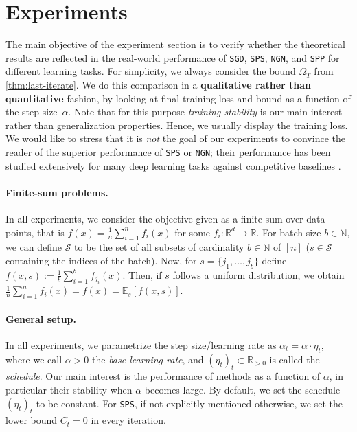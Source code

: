 \documentclass{article}
\newcommand{\R}{\mathbb{R}}
\newcommand{\N}{\mathbb{N}}
\newcommand{\E}{\mathbb{E}}
\newcommand{\SGD}{{\texttt{SGD}}}
\newcommand{\SPP}{{\texttt{SPP}}}
\newcommand{\SPS}{{\texttt{SPS}}}
\newcommand{\NGN}{{\texttt{NGN}}}
\theoremstyle{plain}
\theoremstyle{definition}
\theoremstyle{remark}
\begin{document}
\section{Experiments}\label{sec:experiments}
%
The main objective of the experiment section is to verify whether the theoretical results are reflected in the real-world performance of \SGD{}, \SPS{}, \NGN{}, and \SPP{} for different learning tasks. For simplicity, we always consider the bound $\Omega_T$ from  \cref{thm:last-iterate}. We do this comparison in a \textbf{qualitative rather than quantitative} fashion, by looking at final training loss and bound as a function of the step size~$\alpha$.
Note that for this purpose \emph{training stability} is our main interest rather than generalization properties. Hence, we usually display the training loss.
We would like to stress that it is \emph{not} the goal of our experiments to convince the reader of the superior performance of \SPS{} or \NGN{}; their performance has been studied extensively for many deep learning tasks against competitive baselines \citep{Schaipp2024a,Islamov2025,Schaipp2023}.

\paragraph{Finite-sum problems.} In all experiments, we consider the objective given as a finite sum over data points, that is $f(x) = \frac{1}{n} \sum_{i=1}^n f_i(x)$ for some $f_i:\R^d \to \R$. For batch size $b\in \N$, we can define $\mathcal{S}$ to be the set of all subsets of cardinality $b\in \N$ of $[n]$ ($s \in \mathcal{S}$ containing the indices of the batch).
Now, for $s=\{j_1,\ldots,j_b\}$ define $f(x,s) := \frac{1}{b}\sum_{i=1}^b f_{j_i}(x)$. Then, if $s$ follows a uniform distribution, we obtain $\frac{1}{n}\sum_{i=1}^n f_i(x) = f(x)= \E_s[f(x,s)]$.

\paragraph{General setup.} In all experiments, we parametrize the step size/learning rate as $\alpha_t = \alpha \cdot \eta_t$, where we call $\alpha > 0$ the \emph{base learning-rate}, and $(\eta_t)_t \subset \R_{> 0}$ is called the \emph{schedule}. Our main interest is the performance of methods as a function of $\alpha$, in particular their stability when $\alpha$ becomes large. By default, we set the schedule $(\eta_t)_t$ to be constant.
For \SPS{}, if not explicitly mentioned otherwise, we set the lower bound $C_t=0$ in every iteration.
\end{document}
